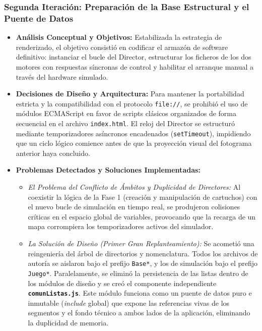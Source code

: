 \subsubsection{Segunda Iteración: Preparación de la Base Estructural y el Puente de Datos}
\begin{itemize}
	\item \textbf{Análisis Conceptual y Objetivos:} Estabilizada la estrategia de renderizado, el objetivo consistió en codificar el armazón de software definitivo: instanciar el bucle del Director, estructurar los ficheros de los dos motores con respuestas síncronas de control y habilitar el arranque manual a través del hardware simulado.
	\item \textbf{Decisiones de Diseño y Arquitectura:} Para mantener la portabilidad estricta y la compatibilidad con el protocolo \texttt{file://}, se prohibió el uso de módulos ECMAScript en favor de scripts clásicos organizados de forma secuencial en el archivo \texttt{index.html}. El reloj del Director se estructuró mediante temporizadores asíncronos encadenados (\texttt{setTimeout}), impidiendo que un ciclo lógico comience antes de que la proyección visual del fotograma anterior haya concluido.
	\item \textbf{Problemas Detectados y Soluciones Implementadas:}
	\begin{itemize}
		\item \textit{El Problema del Conflicto de Ámbitos y Duplicidad de Directores:} Al coexistir la lógica de la Fase 1 (creación y manipulación de cartuchos) con el nuevo bucle de simulación en tiempo real, se produjeron colisiones críticas en el espacio global de variables, provocando que la recarga de un mapa corrompiera los temporizadores activos del simulador.
		\item \textit{La Solución de Diseño (Primer Gran Replanteamiento):} Se acometió una reingeniería del árbol de directorios y nomenclatura. Todos los archivos de autoría se aislaron bajo el prefijo \texttt{Base*}, y los de simulación bajo el prefijo \texttt{Juego*}. Paralelamente, se eliminó la persistencia de las listas dentro de los módulos de diseño y se creó el componente independiente \textbf{\texttt{comunListas.js}}. Este módulo funciona como un puente de datos puro e inmutable (\textit{include} global) que expone las referencias vivas de los segmentos y el fondo técnico a ambos lados de la aplicación, eliminando la duplicidad de memoria.
	\end{itemize}
\end{itemize}


